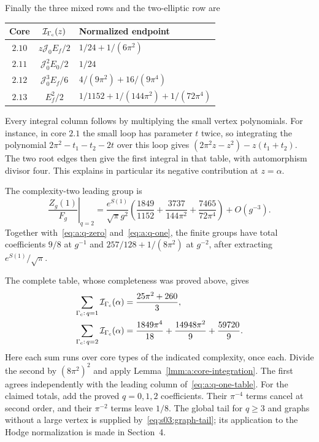 Finally the three mixed rows and the two-elliptic row are
\begin{center}
\begin{tabular}{ccl}
 Core&$\mathcal I_{\Gamma_{\rm c}}(z)$&Normalized endpoint\\[1mm]\hline
 \noalign{\smallskip}
 $2.10$&$z\mathcal J_0E_f/2$&$1/24+1/(6\pi^2)$\\[1mm]
 $2.11$&$\mathcal J_0^2E_0/2$&$1/24$\\[1mm]
 $2.12$&$\mathcal J_0^3E_f/6$&$4/(9\pi^2)+16/(9\pi^4)$\\[1mm]
 $2.13$&$E_f^2/2$&$1/1152+1/(144\pi^2)+1/(72\pi^4)$
\end{tabular}
\end{center}

Every integral column follows by multiplying the small vertex
polynomials. For instance, in core $2.1$ the small loop has parameter
$t$ twice, so integrating the polynomial
$2\pi^2-t_1-t_2-2t$ over this loop gives
$(2\pi^2z-z^2)-z(t_1+t_2)$. The two root edges then give the first
integral in that table, with automorphism divisor four. This explains
in particular its negative contribution at $z=\alpha$.

\begin{prp}\label{prp:a:finite-summary}
The complexity-two leading group is
\begin{equation}\label{eq:a:q-two}
 \left.\frac{Z_g(1)}{F_g}\right|_{q=2}
 =\frac{e^{S(1)}}{\sqrt\pi g^2}
 \left(\frac{1849}{1152}+\frac{3737}{144\pi^2}
                             +\frac{7465}{72\pi^4}\right)+O(g^{-3}).
\end{equation}
Together with~\eqref{eq:a:q-zero} and~\eqref{eq:a:q-one}, the finite
groups have total coefficients $9/8$ at $g^{-1}$ and
$257/128+1/(8\pi^2)$ at $g^{-2}$, after extracting
$e^{S(1)}/\sqrt\pi$.
\end{prp}
\begin{prf}
The complete table, whose completeness was proved above, gives
\begin{align*}
 \sum_{\Gamma_{\rm c}:\,q=1}\mathcal I_{\Gamma_{\rm c}}(\alpha)
                 &=\frac{25\pi^2+260}{3},\\
 \sum_{\Gamma_{\rm c}:\,q=2}\mathcal I_{\Gamma_{\rm c}}(\alpha)
                 &=\frac{1849\pi^4}{18}
                         +\frac{14948\pi^2}{9}+\frac{59720}{9}.
\end{align*}
Here each sum runs over core types of the indicated complexity, once
each. Divide the second by $(8\pi^2)^2$ and apply
Lemma~\ref{lmm:a:core-integration}. The first agrees independently
with the leading column of~\eqref{eq:a:q-one-table}.
For the claimed totals, add the proved $q=0,1,2$ coefficients. Their
$\pi^{-4}$ terms cancel at second order, and their $\pi^{-2}$ terms
leave $1/8$. The global tail for $q\geq3$ and graphs without a large
vertex is supplied by~\eqref{eq:s03:graph-tail}; its application to
the Hodge normalization is made in Section~4.
\end{prf}

